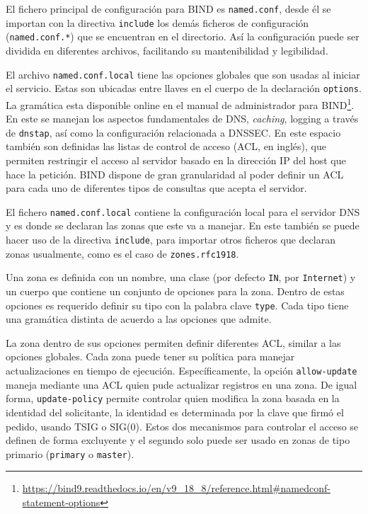 El fichero principal de configuración para BIND es \verb+named.conf+, desde él se importan con la directiva \verb+include+ los demás ficheros de configuración (\verb+named.conf.*+) que se encuentran en el directorio. Así la configuración puede ser dividida en diferentes archivos, facilitando su mantenibilidad y legibilidad.

El archivo \verb+named.conf.local+ tiene las opciones globales que son usadas al iniciar el servicio. Estas son ubicadas entre llaves en el cuerpo de la declaración \verb+options+. La gramática esta disponible online en el manual de administrador para BIND\footnote{\url{https://bind9.readthedocs.io/en/v9_18_8/reference.html\#namedconf-statement-options}}. En este se manejan los aspectos fundamentales de DNS, \textit{caching}, logging a través de \verb+dnstap+, así como la configuración relacionada a DNSSEC. En este espacio también son definidas las listas de control de acceso (ACL, en inglés), que permiten restringir el acceso al servidor basado en la dirección IP del host que hace la petición. BIND dispone de gran granularidad al poder definir un ACL para cada uno de diferentes tipos de consultas que acepta el servidor.

El fichero \verb+named.conf.local+ contiene la configuración local para el servidor DNS y es donde se declaran las zonas que este va a manejar. En este también se puede hacer uso de la directiva \verb+include+, para importar otros ficheros que declaran zonas usualmente, como es el caso de \verb+zones.rfc1918+.

Una zona es definida con un nombre, una clase (por defecto \verb+IN+, por \verb+Internet+) y un cuerpo que contiene un conjunto de opciones para la zona. Dentro de estas opciones es requerido definir su tipo con la palabra clave \verb+type+. Cada tipo tiene una gramática distinta de acuerdo a las opciones que admite.

La zona dentro de sus opciones permiten definir diferentes ACL, similar a las opciones globales. Cada zona puede tener su política para manejar actualizaciones en tiempo de ejecución. Específicamente, la opción \verb+allow-update+ maneja mediante una ACL quien pude actualizar registros en una zona. De igual forma, \verb+update-policy+ permite controlar quien modifica la zona basada en la identidad del solicitante, la identidad es determinada por la clave que firmó el pedido, usando TSIG o SIG(0). Estos dos mecanismos para controlar el acceso se definen de forma excluyente y el segundo solo puede ser usado en zonas de tipo primario (\verb+primary+ o \verb+master+).

